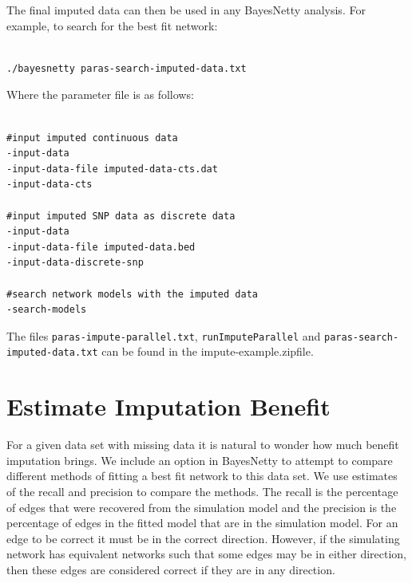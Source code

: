 \documentclass[a4paper,12pt]{article}
\newcommand{\code}[1]{{\footnotesize{{\tt #1}}}}
\begin{document}
The final imputed data can then be used in any BayesNetty analysis. For example, to search for the best fit network: 
\vspace{0.35cm} \begin{lstlisting}

./bayesnetty paras-search-imputed-data.txt

\end{lstlisting} \vspace{0.35cm}
Where the parameter file is as follows: 
\vspace{0.35cm} \begin{lstlisting}

#input imputed continuous data
-input-data
-input-data-file imputed-data-cts.dat
-input-data-cts

#input imputed SNP data as discrete data
-input-data
-input-data-file imputed-data.bed
-input-data-discrete-snp

#search network models with the imputed data
-search-models

\end{lstlisting} \vspace{0.35cm}
The files \code{paras-impute-parallel.txt}, \code{runImputeParallel} and \code{paras-search-imputed-data.txt} can be found in the impute-example.zipfile. 




\section{Estimate Imputation Benefit}
\label{estimate-impute}

For a given data set with missing data it is natural to wonder how much benefit imputation brings. We include an option in BayesNetty to attempt to compare different methods of fitting a best fit network to this data set. We use estimates of the recall and precision to compare the methods. The recall is the percentage of edges that were recovered from the simulation model and the precision is the percentage of edges in the fitted model that are in the simulation model. For an edge to be correct it must be in the correct direction. However, if the simulating network has equivalent networks such that some edges may be in either direction, then these edges are considered correct if they are in any direction. 
\end{document}
